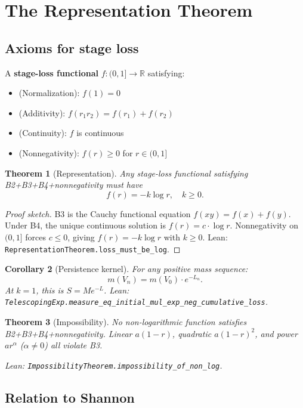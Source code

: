 \documentclass[11pt,a4paper]{article}
\newtheorem{theorem}{Theorem}
\newtheorem{corollary}[theorem]{Corollary}
\begin{document}
\section{The Representation Theorem}
\label{sec:rep}

\subsection{Axioms for stage loss}

A \textbf{stage-loss functional} $f:(0,1]\to\mathbb{R}$ satisfying:
\begin{itemize}
\item[\textbf{B2}] (Normalization): $f(1)=0$
\item[\textbf{B3}] (Additivity): $f(r_1 r_2)=f(r_1)+f(r_2)$
\item[\textbf{B4}] (Continuity): $f$ is continuous
\item (Nonnegativity): $f(r)\geq 0$ for $r\in(0,1]$
\end{itemize}

\begin{theorem}[Representation]
Any stage-loss functional satisfying B2+B3+B4+nonnegativity must have
\[
f(r) = -k\log r, \quad k\geq 0.
\]
\end{theorem}

\begin{proof}[Proof sketch]
B3 is the Cauchy functional equation $f(xy)=f(x)+f(y)$. Under B4, the unique continuous solution is $f(r)=c\cdot\log r$. Nonnegativity on $(0,1]$ forces $c\leq 0$, giving $f(r)=-k\log r$ with $k\geq 0$. Lean: \texttt{RepresentationTheorem.loss\_must\_be\_log}.
\end{proof}

\begin{corollary}[Persistence kernel]
For any positive mass sequence:
\[
m(V_n) = m(V_0)\cdot e^{-L_n}.
\]
At $k=1$, this is $S=Me^{-L}$. Lean: \texttt{TelescopingExp.measure\_eq\_initial\_mul\_exp\_neg\_cumulative\_loss}.
\end{corollary}

\begin{theorem}[Impossibility]
No non-logarithmic function satisfies B2+B3+B4+nonnegativity. Linear $a(1-r)$, quadratic $a(1-r)^2$, and power $ar^\alpha$ ($\alpha\neq 0$) all violate B3.

Lean: \texttt{ImpossibilityTheorem.impossibility\_of\_non\_log}.
\end{theorem}

\subsection{Relation to Shannon}
\end{document}
